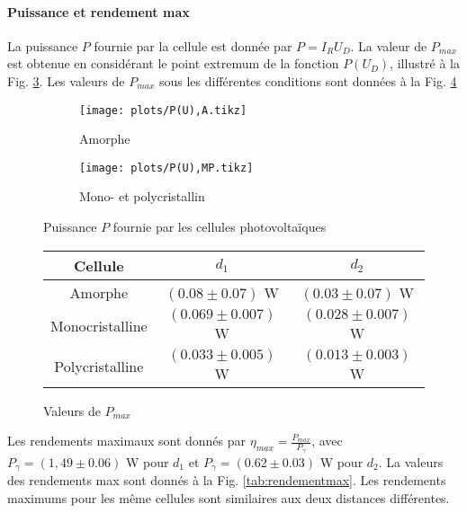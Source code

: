 \paragraph*{Puissance et rendement max}
La puissance \(P\) fournie par la cellule est donnée par \(P = I_R U_D\). La valeur de \(P_{max}\) est obtenue en considérant le point extremum de la fonction \(P(U_D)\), illustré à la Fig. \ref{plot:3}. Les valeurs de \(P_{max}\) sous les différentes conditions sont données à la Fig. \ref{tab:pmax}

\begin{figure}
    \centering
    \begin{subfigure}[c]{0.45\linewidth}
        \centering
        \texttt{[image: plots/P(U),A.tikz]}
        \caption{Amorphe}
        \label{plot:3a}        
    \end{subfigure}
    \begin{subfigure}[c]{0.45\linewidth}
        \centering
        \texttt{[image: plots/P(U),MP.tikz]}
        \caption{Mono- et polycristallin}
        \label{plot:3b}        
    \end{subfigure}
    \caption{Puissance \(P\) fournie par les cellules photovoltaïques}
    \label{plot:3}
\end{figure}

\begin{figure}
    \centering
    \begin{tabulary}{0.7\linewidth}{C C C}
        \toprule
        Cellule & \(d_1\) & \(d_2\) \\
        \midrule
        Amorphe & \((0.08 \pm 0.07)\) \unit{\watt} & \((0.03 \pm 0.07)\) \unit{\watt} \\
        Monocristalline & \((0.069 \pm 0.007)\) \unit{\watt} & \((0.028 \pm 0.007)\) \unit{\watt} \\
        Polycristalline & \((0.033 \pm 0.005)\) \unit{\watt} & \((0.013 \pm 0.003)\) \unit{\watt} \\
        \bottomrule
    \end{tabulary}
    \caption{Valeurs de \(P_{max}\)}
    \label{tab:pmax}
\end{figure}

Les rendements maximaux sont donnés par \(\eta_{max} = \frac{P_{max}}{P_\gamma}\), avec \(P_\gamma = (1,49 \pm 0.06)\) \unit{\watt} pour \(d_1\) et \(P_\gamma = (0.62 \pm 0.03)\) \unit{\watt} pour \(d_2\). La valeurs des rendements max sont donnés à la Fig. \ref{tab:rendementmax}. Les rendements maximums pour les même cellules sont similaires aux deux distances différentes. 


